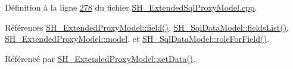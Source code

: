 Définition à la ligne \hyperlink{SH__ExtendedSqlProxyModel_8cpp_source_l00278}{278} du fichier \hyperlink{SH__ExtendedSqlProxyModel_8cpp_source}{S\-H\-\_\-\-Extended\-Sql\-Proxy\-Model.\-cpp}.



Références \hyperlink{classSH__ExtendedProxyModel_a75081819198741a532eefd5875a90678}{S\-H\-\_\-\-Extended\-Proxy\-Model\-::field()}, \hyperlink{classSH__SqlDataModel_a571bdc1f9592bd13f98fd748563d46c0}{S\-H\-\_\-\-Sql\-Data\-Model\-::fields\-List()}, \hyperlink{classSH__ExtendedProxyModel_a8c8b8930c6b1abd9bbb1dce1fdc9690b}{S\-H\-\_\-\-Extended\-Proxy\-Model\-::model}, et \hyperlink{classSH__SqlDataModel_aa487bb763eaf2544e4eb5822cd666105}{S\-H\-\_\-\-Sql\-Data\-Model\-::role\-For\-Field()}.



Référencé par \hyperlink{classSH__ExtendedProxyModel_aaaddcc27fdce4ef70f242460b8e053da}{S\-H\-\_\-\-Extended\-Proxy\-Model\-::set\-Data()}.


